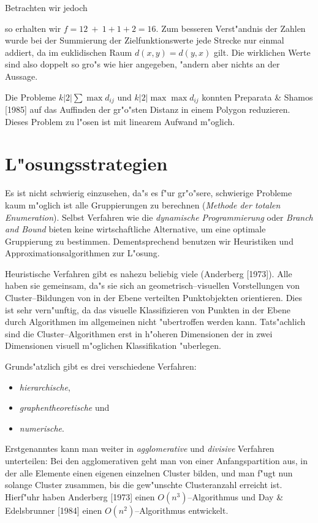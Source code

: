 Betrachten wir jedoch
\vspace*{3mm}



so erhalten wir $f = 12 \ + \ 1 + 1 + 2 = 16.$
Zum besseren Verst"andnis der Zahlen wurde bei
der Summierung der Zielfunktionswerte 
jede Strecke nur einmal addiert, da im euklidischen Raum 
$d(x,y) = d(y,x)$ gilt. Die wirklichen Werte sind also doppelt so
gro"s wie hier angegeben, "andern aber nichts an der Aussage.

Die Probleme $k|2|\sum\max d_{ij}$ und $k|2|\max\max d_{ij}$ konnten
Preparata \& Shamos [1985] auf das Auf\/finden der gr"o"sten Distanz
in einem Polygon reduzieren. Dieses Problem zu l"osen ist mit
linearem Aufwand m"oglich.


\section{L"osungsstrategien}
Es ist nicht schwierig einzusehen, da"s es f"ur gr"o"sere,
schwierige Probleme kaum 
m"oglich ist alle Gruppierungen zu berechnen ({\em Methode der totalen 
Enumeration}).
Selbst Verfahren wie die {\em dynamische Programmierung} oder {\em Branch
and Bound} bieten keine wirtschaftliche Alternative, um eine optimale
Gruppierung zu bestimmen.  Dementsprechend
benutzen wir Heuristiken und Approximationsalgorithmen zur L"osung.

Heuristische Verfahren gibt es nahezu beliebig viele (Anderberg [1973]).
Alle haben sie gemeinsam, da"s sie sich an geometrisch--visuellen
Vorstellungen von Cluster--Bildungen von in der Ebene verteilten 
Punktobjekten orientieren. Dies ist sehr vern"unftig, da das visuelle
Klassifizieren von Punkten in der Ebene durch Algorithmen im 
allgemeinen nicht "ubertroffen werden kann.
Tats"achlich sind die Cluster--Algorithmen erst in h"oheren Dimensionen
der in zwei Dimensionen visuell m"oglichen Klassifikation
"uberlegen.

Grunds"atzlich gibt es drei verschiedene Verfahren:
\begin{itemize}
\item {\em hierarchische},
\item {\em graphentheoretische} und
\item {\em numerische}.
\end{itemize}
Erstgenanntes kann man weiter in {\em agglomerative} und {\em divisive}
Verfahren
unterteilen: Bei den agglomerativen geht man von einer Anfangspartition 
aus, in der alle Elemente einen eigenen einzelnen Cluster bilden, 
und man f"ugt nun solange Cluster zusammen, bis die gew"unschte
Clusteranzahl erreicht ist.
Hierf"uhr haben Anderberg [1973] einen $O(n^3)$--Algorithmus und
Day \& Edelsbrunner [1984] einen $O(n^2)$--Algorithmus entwickelt.

